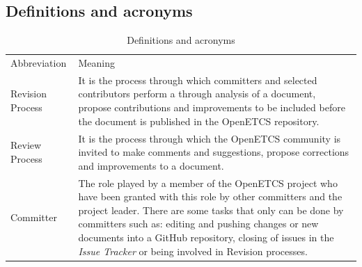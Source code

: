 \documentclass{template/openetcs_article}
\begin{document}
\subsection{Definitions and acronyms}
\begin{table}[H]
\begin{tabular}{|m{3cm}|m{11cm}|}
\hline
\rowcolor{myblue}
\multicolumn{2}{|c|}{Definitions and acronyms} \\\hline
\rowcolor{lightgray}
Abbreviation &
Meaning
\\\hline
Revision Process &
It is the process through which committers and selected contributors perform a through analysis of a document, propose contributions and improvements to be included before the document is published in the OpenETCS repository.
\\\hline
Review Process &
It is the process through which the OpenETCS community is invited to make comments and suggestions, propose corrections and improvements to a document.
\\\hline
Committer &
The role played by a member of the OpenETCS project who have been granted with this role by other committers and the project leader. There are some tasks that only can be done by committers such as: editing and pushing changes or new documents into a GitHub repository, closing of issues in the {\it Issue Tracker} or being involved in Revision processes.
\\\hline
\end{tabular}
\caption{Definitions and acronyms}
\end{table}
\end{document}
